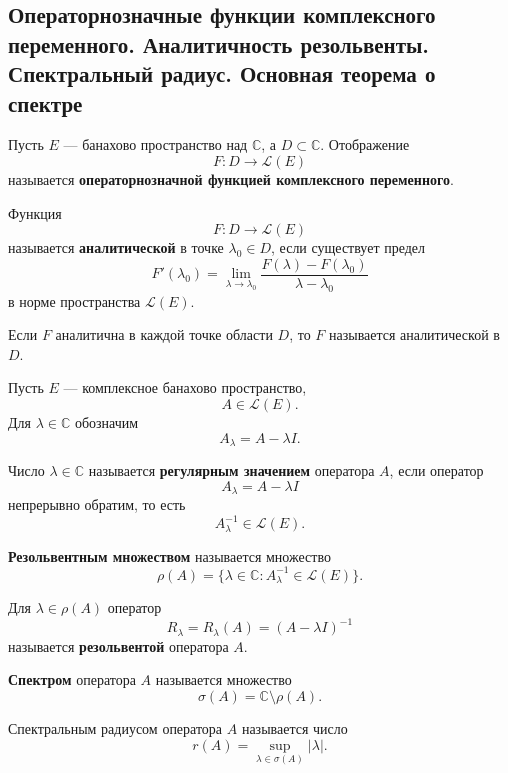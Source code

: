 \subsection{Операторнозначные функции комплексного переменного. Аналитичность резольвенты. Спектральный радиус. Основная теорема о спектре}

\begin{definition}
	Пусть \(E\) --- банахово пространство над \(\mathbb{C}\), а \(D\subset\mathbb{C}\).
	Отображение
	\[
	F:D\to\mathcal{L}(E)
	\]
	называется \textbf{операторнозначной функцией комплексного переменного}.
\end{definition}

\begin{definition}
	Функция
	\[
	F:D\to\mathcal{L}(E)
	\]
	называется \textbf{аналитической} в точке \(\lambda_0\in D\), если существует предел
	\[
	F'(\lambda_0)
	=
	\lim_{\lambda\to\lambda_0}
	\frac{F(\lambda)-F(\lambda_0)}{\lambda-\lambda_0}
	\]
	в норме пространства \(\mathcal{L}(E)\).
	
	Если \(F\) аналитична в каждой точке области \(D\), то \(F\) называется аналитической в \(D\).
\end{definition}


\begin{definition}
	Пусть \(E\) --- комплексное банахово пространство,
	\[
	A\in\mathcal{L}(E).
	\]
	Для \(\lambda\in\mathbb{C}\) обозначим
	\[
	A_\lambda=A-\lambda I.
	\]
	
	Число \(\lambda\in\mathbb{C}\) называется \textbf{регулярным значением} оператора \(A\), если оператор
	\[
	A_\lambda=A-\lambda I
	\]
	непрерывно обратим, то есть
	\[
	A_\lambda^{-1}\in\mathcal{L}(E).
	\]
	
	\textbf{Резольвентным множеством} называется множество
	\[
	\rho(A)=\{\lambda\in\mathbb{C}: A_\lambda^{-1}\in\mathcal{L}(E)\}.
	\]
	
	Для \(\lambda\in\rho(A)\) оператор
	\[
	R_\lambda=R_\lambda(A)=(A-\lambda I)^{-1}
	\]
	называется \textbf{резольвентой} оператора \(A\).
	
	\textbf{Спектром} оператора \(A\) называется множество
	\[
	\sigma(A)=\mathbb{C}\setminus\rho(A).
	\]
\end{definition}

\begin{definition}
	Спектральным радиусом оператора \(A\) называется число
	\[
	r(A)=\sup_{\lambda\in\sigma(A)}|\lambda|.
	\]
\end{definition}

